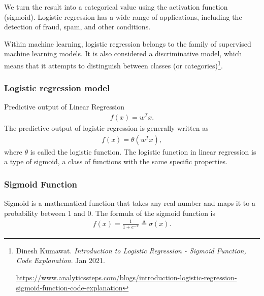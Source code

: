 We turn the result into a categorical value using the activation function (sigmoid). Logistic regression has a wide range of applications, including the detection of fraud, spam, and other conditions.

Within machine learning, logistic regression belongs to the family of supervised machine learning models. It is also considered a discriminative model, which means that it attempts to distinguish between classes (or categories)\footnote{Dinesh Kumawat. \textit{Introduction to Logistic Regression - Sigmoid Function, Code Explanation}. Jan 2021. \raggedright\url{https://www.analyticssteps.com/blogs/introduction-logistic-regression-sigmoid-function-code-explanation}}.
\subsubsection{Logistic regression model}
\hspace{0.5cm}Predictive output of Linear Regression
\begin{align*}
	f(x) = w^T x.
\end{align*}
\hspace{0.5cm}The predictive output of logistic regression is generally written as
\begin{align*}
	f(x) = \theta(w^T x),
\end{align*}
where $\theta$ is called the logistic function. The logistic function in linear regression is a type of sigmoid, a class of functions with the same specific properties.
\subsubsection{Sigmoid Function}
\hspace{0.5cm}Sigmoid is a mathematical function that takes any real number and maps it to a probability between 1 and 0.
The formula of the sigmoid function is
\begin{align*}
    f(x) = \frac{1}{1 + e^{-x}} \triangleq \sigma(x).
\end{align*}

